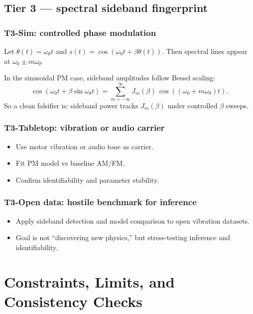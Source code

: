 ﻿\documentclass[twocolumn,aps,prd,nofootinbib]{revtex4-2}
\begin{document}
\subsection{Tier 3 --- spectral sideband fingerprint}
\subsubsection*{T3-Sim: controlled phase modulation}
Let $\theta(t)=\omega_\theta t$ and
$s(t)=\cos(\omega_0 t+\beta\theta(t))$.
Then spectral lines appear at
$\omega_0\pm m\omega_\theta$.

In the sinusoidal PM case, sideband amplitudes follow Bessel scaling:
\begin{equation}
\cos(\omega_0 t + \beta\sin\omega_\theta t)
= \sum_{m=-\infty}^{\infty} J_m(\beta)\,\cos((\omega_0+m\omega_\theta)t).
\end{equation}
So a clean falsifier is: sideband power tracks $J_m(\beta)$ under controlled $\beta$ sweeps.

\subsubsection*{T3-Tabletop: vibration or audio carrier}
\begin{itemize}
    \item Use motor vibration or audio tone as carrier.
    \item Fit PM model vs baseline AM/FM.
    \item Confirm identifiability and parameter stability.
\end{itemize}

\subsubsection*{T3-Open data: hostile benchmark for inference}
\begin{itemize}
    \item Apply sideband detection and model comparison to open vibration datasets.
    \item Goal is not ``discovering new physics,'' but stress-testing inference and identifiability.
\end{itemize}

\section{Constraints, Limits, and Consistency Checks}
\end{document}

